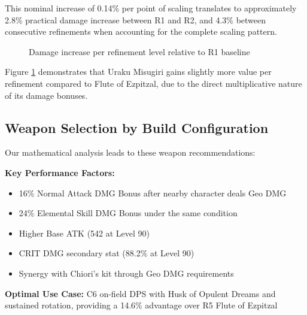 \documentclass[12pt,a4paper]{article}
\begin{document}
This nominal increase of 0.14\% per point of scaling translates to approximately 2.8\% practical damage increase between R1 and R2, and 4.3\% between consecutive refinements when accounting for the complete scaling pattern.

\begin{figure}[H]
\centering
{}
\caption{Damage increase per refinement level relative to R1 baseline}
\label{fig:refinement_value}
\end{figure}

Figure \ref{fig:refinement_value} demonstrates that Uraku Misugiri gains slightly more value per refinement compared to Flute of Ezpitzal, due to the direct multiplicative nature of its damage bonuses.

\subsection{Weapon Selection by Build Configuration}

Our mathematical analysis leads to these weapon recommendations:

\begin{tcolorbox}[colback=geodark!5, colframe=geodark, title=Uraku Misugiri (R1)]
\textbf{Key Performance Factors:}
\begin{itemize}
    \item 16\% Normal Attack DMG Bonus after nearby character deals Geo DMG
    \item 24\% Elemental Skill DMG Bonus under the same condition
    \item Higher Base ATK (542 at Level 90)
    \item CRIT DMG secondary stat (88.2\% at Level 90)
    \item Synergy with Chiori's kit through Geo DMG requirements
\end{itemize}

\textbf{Optimal Use Case:} C6 on-field DPS with Husk of Opulent Dreams and sustained rotation, providing a 14.6\% advantage over R5 Flute of Ezpitzal
\end{tcolorbox}
\end{document}
